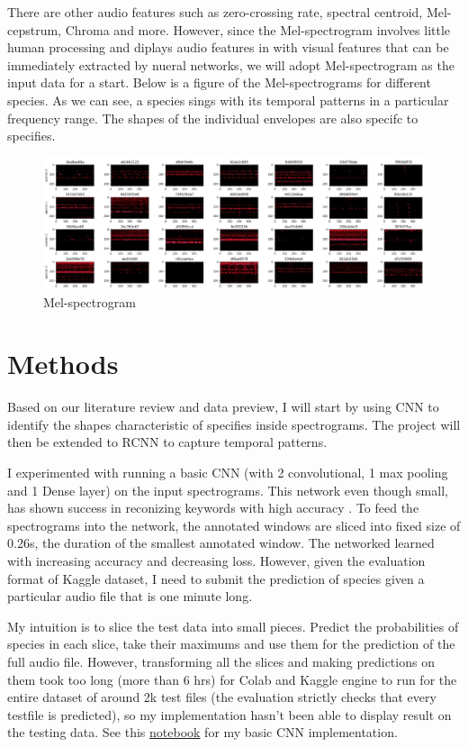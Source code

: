 \documentclass[12pt]{article}
\begin{document}
There are other audio features such as zero-crossing rate, spectral centroid, Mel-cepstrum,  Chroma and more. However, since the Mel-spectrogram involves little human processing and diplays audio features in with visual features that can be immediately extracted by nueral networks, we will adopt Mel-spectrogram as the input data for a start. Below is a figure of the Mel-spectrograms for different species. As we can see, a species sings with its temporal patterns in a particular frequency range. The shapes of the individual envelopes are also specifc to specifies.


\begin{figure}[h!]
    \includegraphics[scale=0.5, center]{species.JPG}
    \caption{Mel-spectrogram}
    \label{fig:Mel-spectrogram}
\end{figure}

\newpage

\section{Methods}
Based on our literature review and data preview, I will start by using CNN to identify the shapes characteristic of specifies inside spectrograms. The project will then be extended to RCNN to capture temporal patterns. 

I experimented with running a basic CNN (with 2 convolutional, 1 max pooling and 1 Dense layer) on the input spectrograms. This network even though small, has shown success in reconizing keywords with high accuracy \cite{KeywordRecognition}. To feed the spectrograms into the network, the annotated windows are sliced into fixed size of 0.26s, the duration of the smallest annotated window. The networked learned with increasing accuracy and decreasing loss. However, given the evaluation format of Kaggle dataset, I need to submit the prediction of species given a particular audio file that is one minute long. 

My intuition is to slice the test data into small pieces. Predict the probabilities of species in each slice, take their maximums and use them for the prediction of the full audio file. However, transforming all the slices and making predictions on them took too long (more than 6 hrs) for Colab and Kaggle engine to run for the entire dataset of around 2k test files (the evaluation strictly checks that every testfile is predicted), so my implementation hasn't been able to display result on the testing data. See this \href{https://colab.research.google.com/drive/1p0j7Wd9AU0Hdjy4hyJS1wBnhpe-etGQ8?usp=sharing}{notebook} for my basic CNN implementation.
\end{document}
